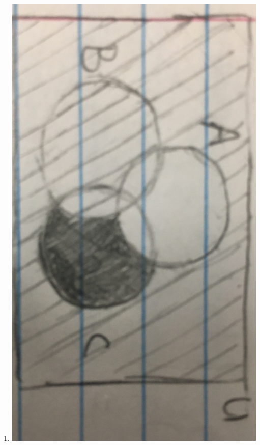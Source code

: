 \documentclass{article}
\theoremstyle{definition}
\begin{document}
\begin{enumerate}[label = \alph*)]
    \item
    \includegraphics[scale = .05, angle = 90]{partB}
    

\end{enumerate}
\end{document}
